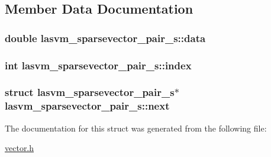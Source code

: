 \subsection{Member Data Documentation}
\hypertarget{structlasvm__sparsevector__pair__s_a0409c8256b7cd0877381edd094dc626a}{
\subsubsection[{data}]{\setlength{\rightskip}{0pt plus 5cm}double lasvm\+\_\+sparsevector\+\_\+pair\+\_\+s\+::data}}\label{structlasvm__sparsevector__pair__s_a0409c8256b7cd0877381edd094dc626a}
\hypertarget{structlasvm__sparsevector__pair__s_abea76f13ce94e14c5dfb2fb3e58ab310}{
\subsubsection[{index}]{\setlength{\rightskip}{0pt plus 5cm}int lasvm\+\_\+sparsevector\+\_\+pair\+\_\+s\+::index}}\label{structlasvm__sparsevector__pair__s_abea76f13ce94e14c5dfb2fb3e58ab310}
\hypertarget{structlasvm__sparsevector__pair__s_a00bf7ee1e8a4795a54a0262e2c23a12d}{
\subsubsection[{next}]{\setlength{\rightskip}{0pt plus 5cm}struct {\bf lasvm\+\_\+sparsevector\+\_\+pair\+\_\+s}$\ast$ lasvm\+\_\+sparsevector\+\_\+pair\+\_\+s\+::next}}\label{structlasvm__sparsevector__pair__s_a00bf7ee1e8a4795a54a0262e2c23a12d}


The documentation for this struct was generated from the following file\+:\begin{DoxyCompactItemize}
\item 
\hyperlink{vector_8h}{vector.\+h}\end{DoxyCompactItemize}
